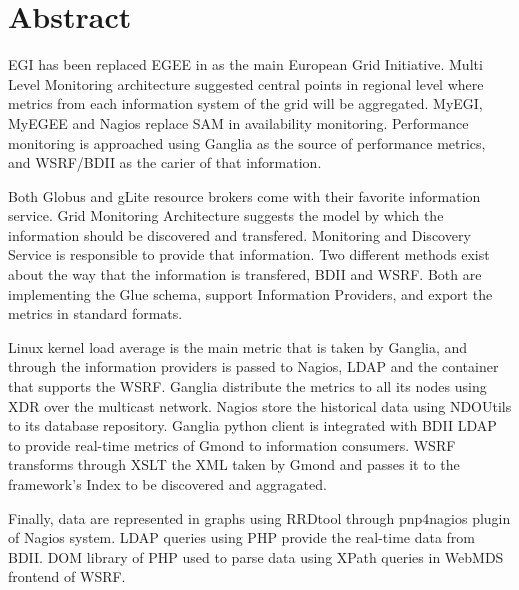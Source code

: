 \section*{Abstract}

EGI has been replaced EGEE in as the main European Grid Initiative. Multi Level Monitoring architecture suggested central points in regional level where metrics from each information system of the grid will be aggregated. MyEGI, MyEGEE and Nagios replace SAM in availability monitoring. Performance monitoring is approached using Ganglia as the source of performance metrics, and WSRF/BDII as the carier of that information.

Both Globus and gLite resource brokers come with their favorite information service. Grid Monitoring Architecture suggests the model by which the information should be discovered and transfered. Monitoring and Discovery Service is responsible to provide that information. Two different methods exist about the way that the information is transfered, BDII and WSRF. Both are implementing the Glue schema, support Information Providers, and export the metrics in standard formats.

Linux kernel load average is the main metric that is taken by Ganglia, and through the information providers is passed to Nagios, LDAP and the container that supports the WSRF. Ganglia distribute the metrics to all its nodes using XDR over the multicast network. Nagios store the historical data using NDOUtils to its database repository. Ganglia python client is integrated with BDII LDAP to provide real-time metrics of Gmond to information consumers. WSRF transforms through XSLT the XML taken by Gmond and passes it to the framework's Index to be discovered and aggragated.

Finally, data are represented in graphs using RRDtool through pnp4nagios plugin of Nagios system. LDAP queries using PHP provide the real-time data from BDII. DOM library of PHP used to parse data using XPath queries in WebMDS frontend of WSRF.

\clearpage
